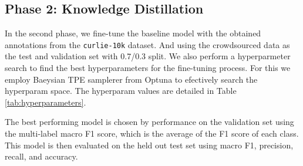 

\subsection* {Phase 2: Knowledge Distillation}
In the second phase, we fine-tune the baseline model with the obtained annotations from the \texttt{curlie-10k} dataset. And using the crowdsourced data as the test and validation set with 0.7/0.3 split.
We also perform a hyperparmeter search to find the best hyperparameters for the fine-tuning process. 
For this we employ Baeysian TPE samplerer from Optuna \cite{optuna} to efectively search the hyperparam space. 
The hyperparam values are detailed in Table \ref{tab:hyperparameters}.


The best performing model is chosen by performance on the validation set using the multi-label macro F1 score, which is the average of the F1 score of each class. 
This model is then evaluated on the held out test set using macro F1, precision, recall, and accuracy.


